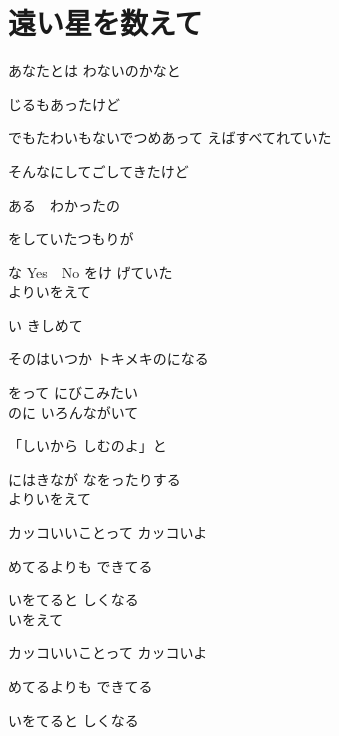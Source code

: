 \section{ 遠い星を数えて}
\large{

 あなたとは わないのかなと

じるもあったけど

でもたわいもないでつめあって えばすべてれていた

そんなにしてごしてきたけど

ある　わかったの

をしていたつもりが

な Yes　No をけ げていた
\\

よりいをえて

い きしめて

そのはいつか トキメキのになる

をって にびこみたい
\\

のに いろんながいて

「しいから しむのよ」と

にはきなが なをったりする
\\

よりいをえて

カッコいいことって カッコいよ

めてるよりも できてる

いをてると しくなる
\\

いをえて

カッコいいことって カッコいよ

めてるよりも できてる

いをてると しくなる

}